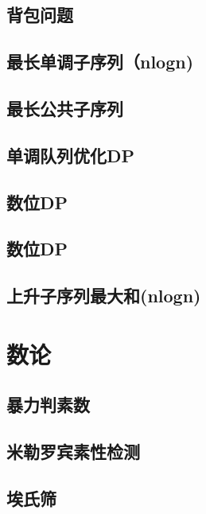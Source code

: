 \section{背包问题}
\raggedbottom
\hrulefill
\section{最长单调子序列（nlogn)}
\raggedbottom
\hrulefill
\section{最长公共子序列}
\raggedbottom
\hrulefill
\section{单调队列优化DP}
\raggedbottom
\hrulefill
\section{数位DP}
\raggedbottom
\hrulefill
\section{数位DP}
\raggedbottom
\hrulefill
\section{上升子序列最大和(nlogn)}
\raggedbottom
\hrulefill

\chapter{数论}
\section{暴力判素数}
\raggedbottom
\hrulefill
\section{米勒罗宾素性检测}
\raggedbottom
\hrulefill
\section{埃氏筛}
\raggedbottom
\hrulefill
